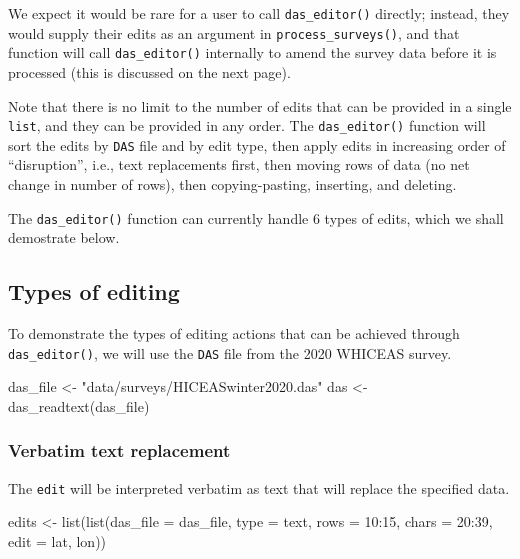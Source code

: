 \documentclass[
]{book}
\newenvironment{Shaded}{\begin{snugshade}}{\end{snugshade}}
\newcommand{\AttributeTok}[1]{\textcolor[rgb]{0.77,0.63,0.00}{#1}}
\newcommand{\DecValTok}[1]{\textcolor[rgb]{0.00,0.00,0.81}{#1}}
\newcommand{\FunctionTok}[1]{\textcolor[rgb]{0.00,0.00,0.00}{#1}}
\newcommand{\NormalTok}[1]{#1}
\newcommand{\OtherTok}[1]{\textcolor[rgb]{0.56,0.35,0.01}{#1}}
\newcommand{\SpecialCharTok}[1]{\textcolor[rgb]{0.00,0.00,0.00}{#1}}
\newcommand{\StringTok}[1]{\textcolor[rgb]{0.31,0.60,0.02}{#1}}
\begin{document}
We expect it would be rare for a user to call \texttt{das\_editor()} directly; instead, they would supply their edits as an argument in \texttt{process\_surveys()}, and that function will call \texttt{das\_editor()} internally to amend the survey data before it is processed (this is discussed on the next page).

Note that there is no limit to the number of edits that can be provided in a single \texttt{list}, and they can be provided in any order. The \texttt{das\_editor()} function will sort the edits by \texttt{DAS} file and by edit type, then apply edits in increasing order of ``disruption'', i.e., text replacements first, then moving rows of data (no net change in number of rows), then copying-pasting, inserting, and deleting.

The \texttt{das\_editor()} function can currently handle 6 types of edits, which we shall demostrate below.

\hypertarget{types-of-editing}{%
\subsection*{Types of editing}\label{types-of-editing}}

To demonstrate the types of editing actions that can be achieved through \texttt{das\_editor()}, we will use the \texttt{DAS} file from the 2020 WHICEAS survey.

\begin{Shaded}
\begin{Highlighting}[]
\NormalTok{das\_file }\OtherTok{\textless{}{-}} \StringTok{"data/surveys/HICEASwinter2020.das"}
\NormalTok{das }\OtherTok{\textless{}{-}} \FunctionTok{das\_readtext}\NormalTok{(das\_file)}
\end{Highlighting}
\end{Shaded}

\hypertarget{verbatim-text-replacement}{%
\subsubsection*{Verbatim text replacement}\label{verbatim-text-replacement}}

The \texttt{edit} will be interpreted verbatim as text that will replace the specified data.

\begin{Shaded}
\begin{Highlighting}[]
\NormalTok{edits }\OtherTok{\textless{}{-}} \FunctionTok{list}\NormalTok{(}\FunctionTok{list}\NormalTok{(}\AttributeTok{das\_file =}\NormalTok{ das\_file, }
                   \AttributeTok{type =} \StringTok{\textquotesingle{}text\textquotesingle{}}\NormalTok{,}
                   \AttributeTok{rows =} \DecValTok{10}\SpecialCharTok{:}\DecValTok{15}\NormalTok{, }
                   \AttributeTok{chars =} \DecValTok{20}\SpecialCharTok{:}\DecValTok{39}\NormalTok{, }
                   \AttributeTok{edit =} \StringTok{\textquotesingle{}lat, lon\textquotesingle{}}\NormalTok{))}
\end{Highlighting}
\end{Shaded}
\end{document}
